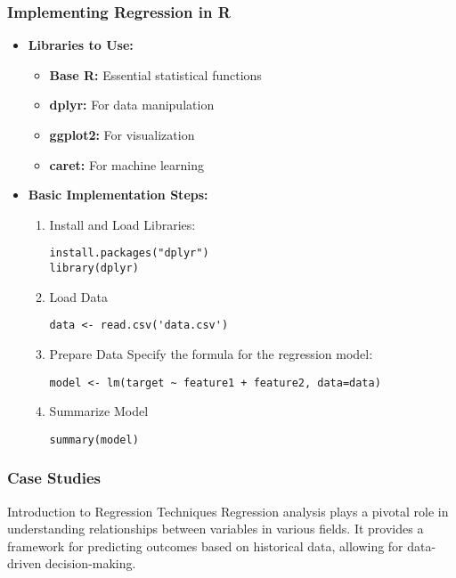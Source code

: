 \documentclass[aspectratio=169]{beamer}
\begin{document}
\begin{frame}
    \frametitle{Implementing Regression in R}
    \begin{itemize}
        \item \textbf{Libraries to Use:}
        \begin{itemize}
            \item \textbf{Base R:} Essential statistical functions
            \item \textbf{dplyr:} For data manipulation
            \item \textbf{ggplot2:} For visualization
            \item \textbf{caret:} For machine learning
        \end{itemize}
        
        \item \textbf{Basic Implementation Steps:}
        \begin{enumerate}
            \item Install and Load Libraries:
            \begin{lstlisting}
install.packages("dplyr")
library(dplyr)
            \end{lstlisting}
            
            \item Load Data
            \begin{lstlisting}
data <- read.csv('data.csv')
            \end{lstlisting}
            
            \item Prepare Data
            Specify the formula for the regression model:
            \begin{lstlisting}
model <- lm(target ~ feature1 + feature2, data=data)
            \end{lstlisting}
            
            \item Summarize Model
            \begin{lstlisting}
summary(model)
            \end{lstlisting}
        \end{enumerate}
    \end{itemize}
\end{frame}

\begin{frame}
    \frametitle{Case Studies}
    \begin{block}{Introduction to Regression Techniques}
        Regression analysis plays a pivotal role in understanding relationships between variables in various fields. 
        It provides a framework for predicting outcomes based on historical data, allowing for data-driven decision-making.
    \end{block}
\end{frame}
\end{document}
